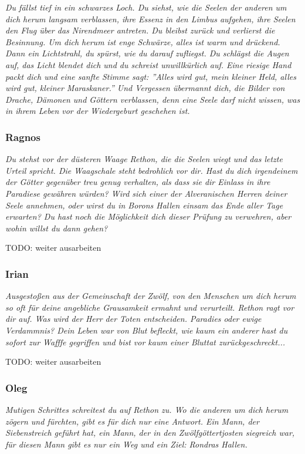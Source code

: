 \emph{Du fällst tief in ein schwarzes Loch. Du siehst, wie die Seelen der anderen um dich herum langsam verblassen, ihre Essenz in den Limbus aufgehen, ihre Seelen den Flug über das Nirendmeer antreten. Du bleibst zurück und verlierst die Besinnung. Um dich herum ist enge Schwärze, alles ist warm und drückend. Dann ein Lichtstrahl, du spürst, wie du darauf zufliegst. Du schlägst die Augen auf, das Licht blendet dich und du schreist unwillkürlich auf. Eine riesige Hand packt dich und eine sanfte Stimme sagt: ''Alles wird gut, mein kleiner Held, alles wird gut, kleiner Maraskaner.'' Und Vergessen übermannt dich, die Bilder von Drache, Dämonen und Göttern verblassen, denn eine Seele darf nicht wissen, was in ihrem Leben vor der Wiedergeburt geschehen ist. }

\subsubsection{Ragnos}

\emph{Du stehst vor der düsteren Waage Rethon, die die Seelen wiegt und das letzte Urteil spricht. Die Waagschale steht bedrohlich vor dir. Hast du dich irgendeinem der Götter gegenüber treu genug verhalten, als dass sie dir Einlass in ihre Paradiese gewähren würden? Wird sich einer der Alveranischen Herren deiner Seele annehmen, oder wirst du in Borons Hallen einsam das Ende aller Tage erwarten? Du hast noch die Möglichkeit dich dieser Prüfung zu verwehren, aber wohin willst du dann gehen?}

TODO: weiter ausarbeiten

\subsubsection{Irian}

\emph{Ausgestoßen aus der Gemeinschaft der Zwölf, von den Menschen um dich herum so oft für deine angebliche Grausamkeit ermahnt und verurteilt. Rethon ragt vor dir auf. Was wird der Herr der Toten entscheiden. Paradies oder ewige Verdammnis? Dein Leben war von Blut befleckt, wie kaum ein anderer hast du sofort zur Wafffe gegriffen und bist vor kaum einer Bluttat zurückgeschreckt...}

TODO: weiter ausarbeiten

\subsubsection{Oleg}

\emph{Mutigen Schrittes schreitest du auf Rethon zu. Wo die anderen um dich herum zögern und fürchten, gibt es für dich nur eine Antwort. Ein Mann, der Siebenstreich geführt hat, ein Mann, der in den Zwölfgöttertjosten siegreich war, für diesen Mann gibt es nur ein Weg und ein Ziel: Rondras Hallen.}

